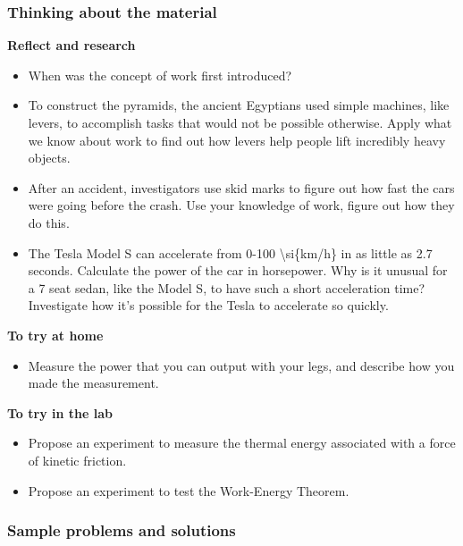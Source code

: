 \subsubsection{Thinking about the material}

\begin{framed}
\textbf{Reflect and research}\\
\begin{itemize}
\item When was the concept of work first introduced?
\item To construct the pyramids, the ancient Egyptians used simple machines, like levers, to accomplish tasks that would not be possible otherwise. Apply what we know about work to find out how levers help people lift incredibly heavy objects.
\item After an accident, investigators use skid marks to figure out how fast the cars were going before the crash. Use your knowledge of work, figure out how they do this.
\item The Tesla Model S can accelerate from 0-100 {\textbackslash}si\{km/h\} in as little as 2.7 seconds. Calculate the power of the car in horsepower. Why is it unusual for a 7 seat sedan, like the Model S, to have such a short acceleration time? Investigate how it's possible for the Tesla to accelerate so quickly.
\end{itemize}
\end{framed}

\begin{framed}
\textbf{To try at home}\\
\begin{itemize}
\item Measure the power that you can output with your legs, and describe how you made the measurement.
\end{itemize}
\end{framed}

\begin{framed}
\textbf{To try in the lab}\\
\begin{itemize}
\item Propose an experiment to measure the thermal energy associated with a force of kinetic friction.
\item Propose an experiment to test the Work-Energy Theorem.
\end{itemize}
\end{framed}

\subsubsection{Sample problems and solutions}

